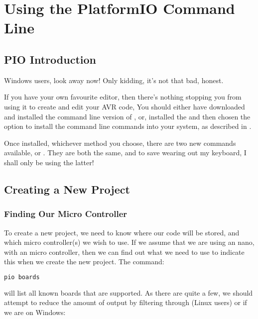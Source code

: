 \chapter{Using the PlatformIO Command Line}\label{using-the-platformio-command-line}

\section{PIO Introduction}\label{pio-introduction}

Windows users, look away now! Only kidding, it's not that bad, honest. 

If you have your own favourite editor, then there's nothing stopping you from using it to create and edit your AVR code, You should either have downloaded and installed the command line version of , or, installed the  and then chosen the option to install the command line commands into your system, as described in . 

Once installed, whichever method you choose, there are two new commands available,  or . They are both the same, and to save wearing out my keyboard, I shall only be using the latter!

\section{Creating a New Project}\label{creating-a-new-project}

\subsection{Finding Our Micro Controller}\label{finding-our-micro-controller}

To create a new project, we need to know where our code will be stored, and which micro controller(s) we wish to use. If we assume that we are using an  nano, with an  micro controller, then we can find out what we need to use to indicate this when we create the new project. The command:

\begin{lstlisting}[language={bash},numbers={none},caption={PIO - Listing Supported Boards}]
pio boards
\end{lstlisting}

will list all known boards that are supported. As there are quite a few, we should attempt to reduce the amount of output by filtering through  (Linux users) or  if we are on Windows:


